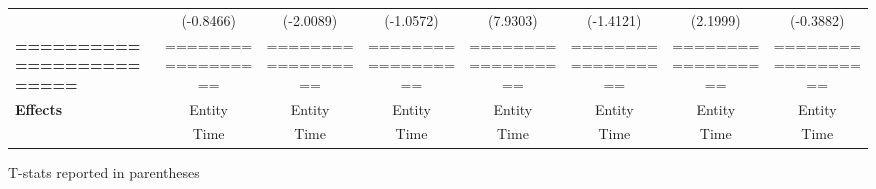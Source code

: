\begin{center}
\begin{tabular}{lccccccc}
\textbf{ }                         &      (-0.8466)       &          (-2.0089)          &          (-1.0572)           &               (7.9303)              &            (-1.4121)             &           (2.1999)          &           (-0.3882)            \\
\textbf{=========================} &  ==================  &      ==================     &      ==================      &          ==================         &        ==================        &      ==================     &       ==================       \\
\textbf{Effects}                   &        Entity        &            Entity           &            Entity            &                Entity               &              Entity              &            Entity           &             Entity             \\
\textbf{}                          &         Time         &             Time            &             Time             &                 Time                &               Time               &             Time            &              Time              \\
\bottomrule
\end{tabular}
\end{center}

T-stats reported in parentheses